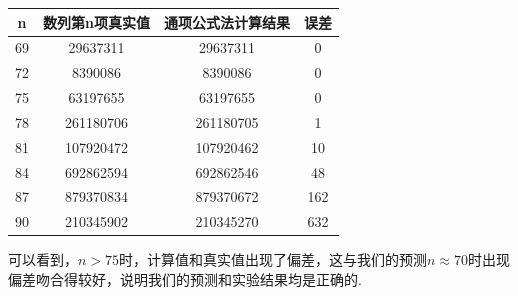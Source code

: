 \documentclass[UTF8]{ctexart}
\begin{document}
\begin{table}[H]
	\begin{center}
		\begin{tabular}{c|c|c|c}
			\hline
			n&数列第n项真实值&通项公式法计算结果&误差\\
			\hline
			\hline
			69 & 29637311 & 29637311 & 0\\
			\hline
			72 & 8390086 & 8390086 & 0\\
			\hline
			75 & 63197655 & 63197655 & 0\\
			\hline
			78 & 261180706 & 261180705 & 1\\
			\hline
			81 & 107920472 & 107920462 & 10\\
			\hline
			84 & 692862594 & 692862546 & 48\\
			\hline
			87 & 879370834 & 879370672 & 162\\
			\hline
			90 & 210345902 & 210345270 & 632\\
			\hline
		\end{tabular}
\end{center}\end{table}
可以看到，$n>75$时，计算值和真实值出现了偏差，这与我们的预测$n\approx 70$时出现偏差吻合得较好，说明我们的预测和实验结果均是正确的.
\end{document}
